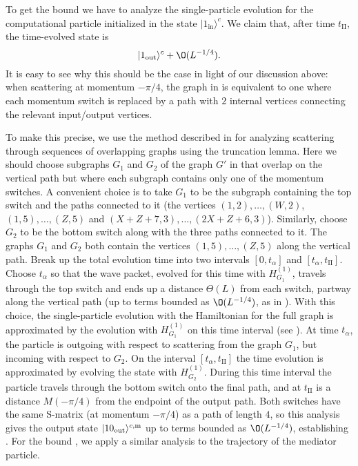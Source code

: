 \documentclass[../thesis-main/thesis-main]{subfiles}
\begin{document}
To get the bound  we have to analyze the single-particle evolution
for the computational particle initialized in the state $|1_\text{in}\rangle^c$. 
We claim that, after time $t_{\mathrm{II}}$, the time-evolved state is
\[
|1_\text{out}\rangle^c+\O(L^{-{1}/{4}}).
\]
It is easy to see why this should be the case in light of our discussion above: when scattering at momentum $-{\pi}/{4}$, the graph in  is equivalent to one where each momentum switch is replaced by a path with $2$ internal vertices connecting the relevant input/output vertices.

To make this precise, we use the method described in  for analyzing scattering through sequences of overlapping graphs using the truncation lemma. Here we should choose subgraphs $G_{1}$ and $G_{2}$ of the graph $G'$ in  that overlap on the vertical path but where each subgraph contains only one of the momentum switches. A convenient choice is to take $G_{1}$ to be the subgraph containing the top switch and the paths connected to it (the vertices $(1,2),\ldots,(W,2)$, $(1,5),\ldots,(Z,5)$ and $(X+Z+7,3),\ldots,(2X+Z+6,3)$). Similarly, choose $G_{2}$ to be the bottom switch along with the three paths connected to it. The graphs $G_{1}$ and $G_{2}$ both contain the vertices $(1,5),\ldots,(Z,5)$ along the vertical path. Break up the total evolution time into two intervals $[0,t_{\alpha}]$ and $[t_{\alpha},t_{\mathrm{II}}]$. Choose $t_{\alpha}$ so that the wave packet, evolved for this time with $H_{G_1}^{(1)}$, travels through the top switch and ends up a distance $\Theta(L)$ from each switch, partway along the vertical path (up to terms bounded as $\O(L^{-{1}/{4}})$, as in ). With this choice, the single-particle evolution with the Hamiltonian for the full graph is approximated by the evolution with $H_{G_1}^{(1)}$ on this time interval (see ). At time $t_\alpha$, the particle is outgoing with respect to scattering from the graph $G_1$, but incoming with respect to $G_2$. On the interval $[t_{\alpha},t_{\mathrm{II}}]$ the time evolution is approximated by evolving the state with $H_{G_2}^{(1)}$. During this time interval the particle travels through the bottom switch onto the final path, and at $t_{\mathrm{II}}$ is a distance $M(-{\pi}/{4})$ from the endpoint of the output path. Both switches have the same S-matrix (at momentum $-{\pi}/{4}$) as a path of length $4$, so this analysis gives the output state $|10_\text{out}\rangle^{c,\mathrm{m}}$ up to terms bounded as $\O(L^{-{1}/{4}})$, establishing . For the bound , we apply a similar analysis to the trajectory of the mediator particle.
\end{document}
